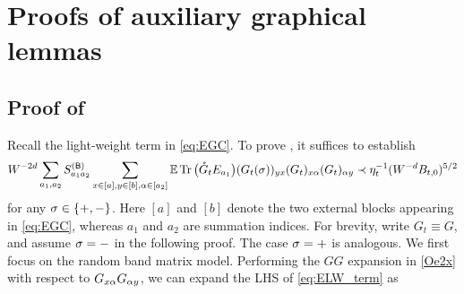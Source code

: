 


\section{Proofs of auxiliary graphical lemmas}


\subsection{Proof of \texorpdfstring{}{Lemma ExpLW}}\label{subsec:pf-LWterm_EXP}


Recall the light-weight term in \eqref{eq:EGC}. To prove , it suffices to establish 
\begin{align}
 W^{-2d}\sum_{a_1, a_2}S^{({\mathsf{B}})}_{a_1a_2} \sum_{x\in [a],y\in [b],\alpha \in [a_2]}\mathbb{E}       
 \operatorname{Tr}\big( {\mathring G}_t E_{a_1} \big)  (G_t(\sigma))_{yx} (G_t)_{x\alpha }(G_t)_{\alpha y} \prec \eta_t^{-1}(W^{-d}B_{t,0})^{5/2}\label{eq:ELW_term}
\end{align} 
for any $\sigma\in\{+,-\}$. Here $[a]$ and $[b]$ denote the two external blocks appearing in \eqref{eq:EGC}, whereas $a_1$ and $a_2$ are summation indices. For brevity, write $G_t\equiv G$, and assume $\sigma=-$ in the following proof. The case $\sigma=+$ is analogous. %
We first focus on the random band matrix model. Performing the $GG$ expansion in \eqref{Oe2x} with respect to $G_{x\alpha}G_{\alpha y}$, we can expand the LHS of \eqref{eq:ELW_term} as 
